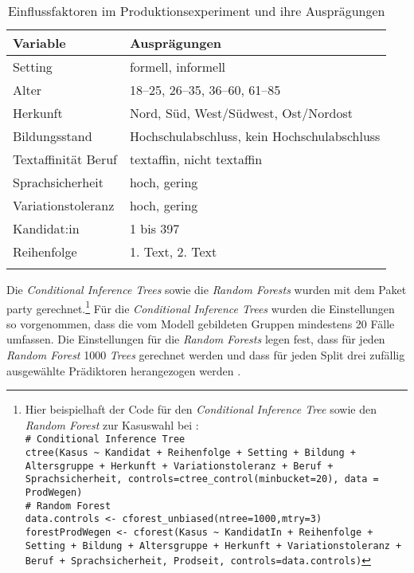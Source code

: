 \begin{table}
\centering
\begin{tabular}{ll}
\lsptoprule
Variable  & Ausprägungen                                                                                   \\ \midrule
Setting           & formell, informell
\\ %
Alter              & 18--25, 26--35, 36--60, 61--85                                                                              \\ %
Herkunft           & Nord, Süd, West/Südwest, Ost/Nordost                                                                                    \\ %
Bildungsstand            & Hochschulabschluss, kein Hochschulabschluss  
\\ %
Textaffinität Beruf           & textaffin, nicht textaffin 
\\ %
Sprachsicherheit           & hoch, gering
\\ %
Variationstoleranz & hoch, gering                                                                                           
\\ %
Kandidat:in & 1 bis 397
\\ %
Reihenfolge & 1. Text, 2. Text                                                                                            \\ 
\lspbottomrule
\end{tabular}
\caption{Einflussfaktoren im Produktionsexperiment und ihre Ausprägungen}
\label{table:CtreesVariablenProd}
\end{table}

Die \textit{Conditional Inference Trees} sowie die \textit{Random Forests} wurden mit dem Paket party \citep[][Version 1.3-4]{Hothorn.2010} gerechnet.\footnote{Hier beispielhaft der Code für den \textit{Conditional Inference Tree} sowie den \textit{Random Forest} zur Kasuswahl bei \wegen:\\
\texttt{\# Conditional Inference Tree\\
ctree(Kasus \~{} Kandidat + Reihenfolge + Setting + Bildung + Altersgruppe + Herkunft + Variationstoleranz + Beruf + Sprachsicherheit, controls=ctree\_control(minbucket=20), data = ProdWegen)\\
\# Random Forest\\
data.controls <- cforest\_unbiased(ntree=1000,mtry=3)\\
forestProdWegen <- cforest(Kasus \~{} KandidatIn + Reihenfolge + Setting + Bildung + Altersgruppe + Herkunft + Variationstoleranz + Beruf + Sprachsicherheit, Prodseit, controls=data.controls)}} 
Für die \textit{Conditional Inference Trees} wurden die Einstellungen so vorgenommen, dass die vom Modell gebildeten Gruppen mindestens 20 Fälle umfassen.
Die Einstellungen für die \textit{Random Forests} legen fest, dass für jeden \textit{Random Forest }1000 \textit{Trees} gerechnet werden und dass für jeden Split drei zufällig ausgewählte Prädiktoren herangezogen werden \citep[s.][297]{Levshina.2015}.

